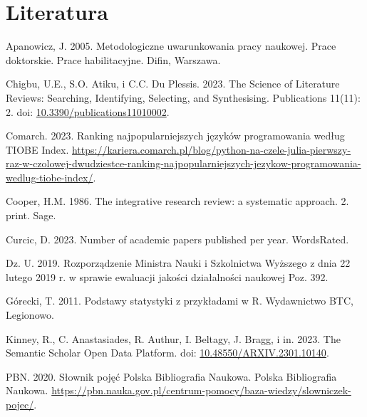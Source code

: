 \documentclass[
  12pt,
]{article}
\newlength{\cslhangindent}
\newlength{\cslentryspacingunit} %
\newenvironment{CSLReferences}[2] %
 {%
  \setlength{\parindent}{0pt}
  \ifodd #1
  \let\oldpar\par
  \def\par{\hangindent=\cslhangindent\oldpar}
  \fi
  \setlength{\parskip}{#2\cslentryspacingunit}
 }%
 {}
\begin{document}
\FloatBarrier
\newpage
{}

\hypertarget{literatura}{%
\section{Literatura}\label{literatura}}

\hypertarget{refs}{}
\begin{CSLReferences}{1}{0}
\leavevmode{}%
Apanowicz, J. 2005. Metodologiczne uwarunkowania pracy naukowej. Prace
doktorskie. Prace habilitacyjne. Difin, Warszawa.

\leavevmode{}%
Chigbu, U.E., S.O. Atiku, i C.C. Du Plessis. 2023. The Science of
Literature Reviews: Searching, Identifying, Selecting, and Synthesising.
Publications 11(11): 2. doi:
\href{https://doi.org/10.3390/publications11010002}{10.3390/publications11010002}.

\leavevmode{}%
Comarch. 2023. Ranking najpopularniejszych języków programowania według
TIOBE Index.
\url{https://kariera.comarch.pl/blog/python-na-czele-julia-pierwszy-raz-w-czolowej-dwudziestce-ranking-najpopularniejszych-jezykow-programowania-wedlug-tiobe-index/}.

\leavevmode{}%
Cooper, H.M. 1986. The integrative research review: a systematic
approach. 2. print. Sage.

\leavevmode{}%
Curcic, D. 2023. Number of academic papers published per year.
WordsRated.

\leavevmode{}%
Dz. U. 2019. Rozporz{ą}dzenie Ministra Nauki i Szkolnictwa Wy{ż}szego z
dnia 22 lutego 2019 r. w sprawie ewaluacji jako{ś}ci dzia{ł}alno{ś}ci
naukowej Poz. 392.

\leavevmode{}%
Górecki, T. 2011. Podstawy statystyki z przyk{ł}adami w R. Wydawnictwo
BTC, Legionowo.

\leavevmode{}%
Kinney, R., C. Anastasiades, R. Authur, I. Beltagy, J. Bragg, i in.
2023. The Semantic Scholar Open Data Platform. doi:
\href{https://doi.org/10.48550/ARXIV.2301.10140}{10.48550/ARXIV.2301.10140}.

\leavevmode{}%
PBN. 2020. Słownik pojęć Polska Bibliografia Naukowa. Polska
Bibliografia Naukowa.
\url{https://pbn.nauka.gov.pl/centrum-pomocy/baza-wiedzy/slowniczek-pojec/}.


\end{CSLReferences}
\end{document}
